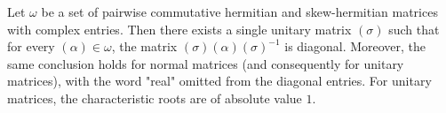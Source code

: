 Let $\omega$ be a set of pairwise commutative hermitian and skew-hermitian matrices with complex entries. Then there exists a single unitary matrix $(\sigma)$ such that for every $(\alpha) \in \omega$, the matrix $(\sigma)(\alpha)(\sigma)^{-1}$ is diagonal. Moreover, the same conclusion holds for normal matrices (and consequently for unitary matrices), with the word "real" omitted from the diagonal entries. For unitary matrices, the characteristic roots are of absolute value $1$.
